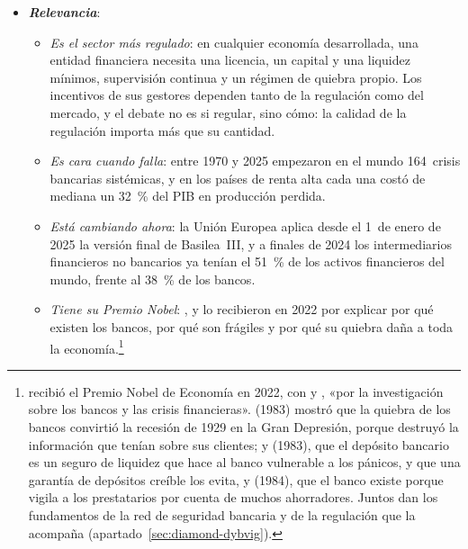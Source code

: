 \documentclass[11pt]{article}
\begin{document}
\begin{itemize}
\item \textbf{\emph{Relevancia}}:
  \begin{itemize}
  \item \emph{Es el sector más regulado}: en cualquier economía desarrollada, una entidad financiera necesita una licencia, un capital y una liquidez mínimos, supervisión continua y un régimen de quiebra propio. Los incentivos de sus gestores dependen tanto de la regulación como del mercado, y el debate no es si regular, sino cómo: la calidad de la regulación importa más que su cantidad.
  \item \emph{Es cara cuando falla}: entre 1970 y 2025 empezaron en el mundo 164~crisis bancarias sistémicas, y en los países de renta alta cada una costó de mediana un 32~\% del PIB en producción perdida\nocite{LaevenValencia2026}.
  \item \emph{Está cambiando ahora}: la Unión Europea aplica desde el 1~de enero de 2025 la versión final de Basilea~III, y a finales de 2024 los intermediarios financieros no bancarios ya tenían el 51~\% de los activos financieros del mundo, frente al 38~\% de los bancos\nocite{RegUE2024CRR3,FSB2025NBFI}.
  \item \emph{Tiene su Premio Nobel}: ,  y  lo recibieron en 2022 por explicar por qué existen los bancos, por qué son frágiles y por qué su quiebra daña a toda la economía.\footnote{ recibió el Premio Nobel de Economía en 2022, con  y , «por la investigación sobre los bancos y las crisis financieras»\nocite{Nobel2022}.  (1983) mostró que la quiebra de los bancos convirtió la recesión de 1929 en la Gran Depresión, porque destruyó la información que tenían sobre sus clientes;  y  (1983), que el depósito bancario es un seguro de liquidez que hace al banco vulnerable a los pánicos, y que una garantía de depósitos creíble los evita, y  (1984), que el banco existe porque vigila a los prestatarios por cuenta de muchos ahorradores\nocite{Bernanke1983Nonmonetary,DiamondDybvig1983Bank,Diamond1984Financial}. Juntos dan los fundamentos de la red de seguridad bancaria y de la regulación que la acompaña (apartado~\ref{sec:diamond-dybvig}).}
  \end{itemize}


\end{itemize}
\end{document}
